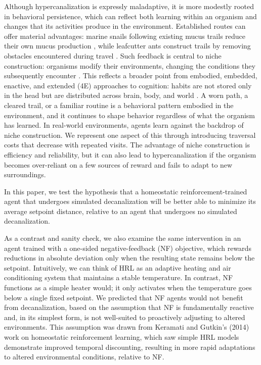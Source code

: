 \documentclass[12pt,fleqn]{article}
\begin{document}
Although hypercanalization is expressly maladaptive, it is more modestly rooted in behavioral persistence, which can reflect both learning within an organism and changes that its activities produce in the environment. Established routes can offer material advantages: marine snails following existing mucus trails reduce their own mucus production \cite{davies_energy_2007}, while leafcutter ants construct trails by removing obstacles encountered during travel \cite{bochynek_infrastructure_2019}. Such feedback is central to niche construction: organisms modify their environments, changing the conditions they subsequently encounter \cite{laland_niche_2016}. This reflects a broader point from embodied, embedded, enactive, and extended (4E) approaches to cognition: habits are not stored only in the head but are distributed across brain, body, and world \cite{barandiaran_genealogical_2014, newen_oxford_2018}. A worn path, a cleared trail, or a familiar routine is a behavioral pattern embodied in the environment, and it continues to shape behavior regardless of what the organism has learned. In real-world environments, agents learn against the backdrop of niche construction. We represent one aspect of this through introducing traversal costs that decrease with repeated visits. The advantage of niche construction is efficiency and reliability, but it can also lead to hypercanalization if the organism becomes over-reliant on a few sources of reward and fails to adapt to new surroundings.

In this paper, we test the hypothesis that a homeostatic reinforcement-trained agent that undergoes simulated decanalization will be better able to minimize its average setpoint distance, relative to an agent that undergoes no simulated decanalization.

As a contrast and sanity check, we also examine the same intervention in an agent trained with a one-sided negative-feedback (NF) objective, which rewards reductions in absolute deviation only when the resulting state remains below the setpoint. Intuitively, we can think of HRL as an adaptive heating and air conditioning system that maintains a stable temperature. In contrast, NF functions as a simple heater would; it only activates when the temperature goes below a single fixed setpoint. We predicted that NF agents would not benefit from decanalization, based on the assumption that NF is fundamentally reactive and, in its simplest form, is not well-suited to proactively adjusting to altered environments. This assumption was drawn from Keramati and Gutkin's (2014) work on homeostatic reinforcement learning, which saw simple HRL models demonstrate improved temporal discounting, resulting in more rapid adaptations to altered environmental conditions, relative to NF. 
\end{document}
